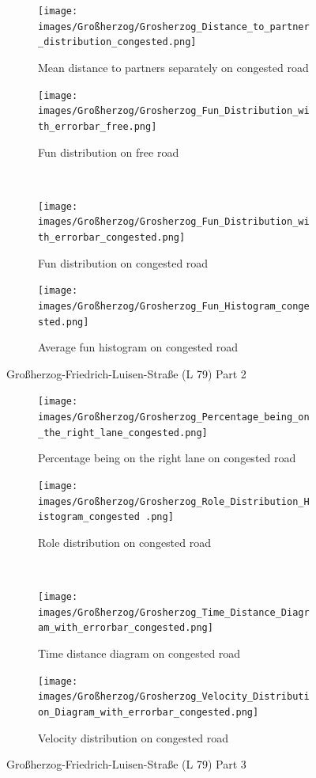 \begin{figure}[H]
    \centering
    \begin{subfigure}[b]{0.45\textwidth}
        \centering
        \texttt{[image: images/Großherzog/Grosherzog\_Distance\_to\_partner\_distribution\_congested.png]}
        \caption{Mean distance to partners separately on congested road}
    \end{subfigure}
    \hfill
    \begin{subfigure}[b]{0.45\textwidth}
        \centering
        \texttt{[image: images/Großherzog/Grosherzog\_Fun\_Distribution\_with\_errorbar\_free.png]}
        \caption{Fun distribution on free road}
    \end{subfigure}
    \\
    \begin{subfigure}[b]{0.45\textwidth}
        \centering
        \texttt{[image: images/Großherzog/Grosherzog\_Fun\_Distribution\_with\_errorbar\_congested.png]}
        \caption{Fun distribution on congested road}
    \end{subfigure}
    \hfill
    \begin{subfigure}[b]{0.45\textwidth}
        \centering
    \texttt{[image: images/Großherzog/Grosherzog\_Fun\_Histogram\_congested.png]}
    \caption{Average fun histogram on congested road}
    \end{subfigure}
    \caption{Großherzog-Friedrich-Luisen-Straße (L 79) Part 2}
\end{figure}

\begin{figure}[H]
    \centering
    \begin{subfigure}[b]{0.45\textwidth}
        \centering
        \texttt{[image: images/Großherzog/Grosherzog\_Percentage\_being\_on\_the\_right\_lane\_congested.png]}
        \caption{Percentage being on the right lane on congested road}
    \end{subfigure}
    \hfill
    \begin{subfigure}[b]{0.45\textwidth}
        \centering
        \texttt{[image: images/Großherzog/Grosherzog\_Role\_Distribution\_Histogram\_congested .png]}
        \caption{Role distribution on congested road}
    \end{subfigure}
    \\
    \begin{subfigure}[b]{0.45\textwidth}
        \centering
        \texttt{[image: images/Großherzog/Grosherzog\_Time\_Distance\_Diagram\_with\_errorbar\_congested.png]}
        \caption{Time distance diagram on congested road}
    \end{subfigure}
    \hfill
    \begin{subfigure}[b]{0.45\textwidth}
        \centering
        \texttt{[image: images/Großherzog/Grosherzog\_Velocity\_Distribution\_Diagram\_with\_errorbar\_congested.png]}
        \caption{Velocity distribution on congested road}
    \end{subfigure}
    \caption{Großherzog-Friedrich-Luisen-Straße (L 79) Part 3}
\end{figure}



